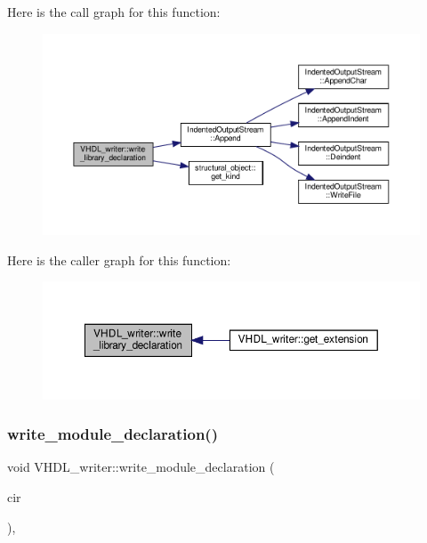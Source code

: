 Here is the call graph for this function\+:
\nopagebreak
\begin{figure}[H]
\begin{center}
\leavevmode
\includegraphics[width=350pt]{d0/d0c/structVHDL__writer_ab617f377af475bddff6b07f327f8b058_cgraph}
\end{center}
\end{figure}
Here is the caller graph for this function\+:
\nopagebreak
\begin{figure}[H]
\begin{center}
\leavevmode
\includegraphics[width=350pt]{d0/d0c/structVHDL__writer_ab617f377af475bddff6b07f327f8b058_icgraph}
\end{center}
\end{figure}
\mbox{\label{structVHDL__writer_a9387c719414e8fb4e8b086ce9d9bc500}} 
\subsubsection{\texorpdfstring{write\+\_\+module\+\_\+declaration()}{write\_module\_declaration()}}
{\footnotesize\ttfamily void V\+H\+D\+L\+\_\+writer\+::write\+\_\+module\+\_\+declaration (\begin{DoxyParamCaption}\item[{const \hyperlink{structural__objects_8hpp_a8ea5f8cc50ab8f4c31e2751074ff60b2}{structural\+\_\+object\+Ref} \&}]{cir }\end{DoxyParamCaption})\hspace{0.3cm}{\ttfamily [override]}, {\ttfamily [virtual]}}



